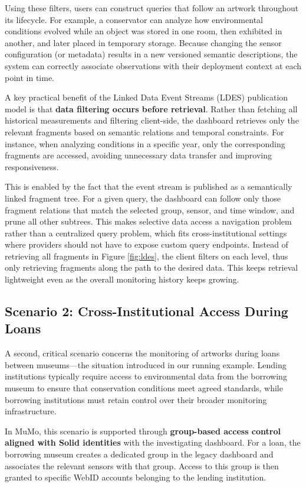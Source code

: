 Using these filters, users can construct queries that follow an artwork
throughout its lifecycle. For example, a conservator can analyze how
environmental conditions evolved while an object was stored in one room,
then exhibited in another, and later placed in temporary storage.
Because changing the sensor configuration (or metadata) results in a new
versioned semantic descriptions, the system can correctly associate
observations with their deployment context at each point in time.

A key practical benefit of the Linked Data Event Streams (LDES)
publication model is that \textbf{data filtering occurs before
retrieval}. Rather than fetching all historical measurements and
filtering client-side, the dashboard retrieves only the relevant
fragments based on semantic relations and temporal constraints. For
instance, when analyzing conditions in a specific year, only the
corresponding fragments are accessed, avoiding unnecessary data transfer
and improving responsiveness.

This is enabled by the fact that the event stream is published as a
semantically linked fragment tree. For a given query, the dashboard can
follow only those fragment relations that match the selected group,
sensor, and time window, and prune all other subtrees. This makes
selective data access a navigation problem rather than a centralized
query problem, which fits cross-institutional settings where providers
should not have to expose custom query endpoints. Instead of retrieving
all fragments in Figure \ref{fig:ldes}, the client filters on each
level, thus only retrieving fragments along the path to the desired
data. This keeps retrieval lightweight even as the overall monitoring
history keeps growing.

\subsection{Scenario 2: Cross-Institutional Access During
Loans}\label{scenario-2-cross-institutional-access-during-loans}

A second, critical scenario concerns the monitoring of artworks during
loans between museums---the situation introduced in our running example.
Lending institutions typically require access to environmental data from
the borrowing museum to ensure that conservation conditions meet agreed
standards, while borrowing institutions must retain control over their
broader monitoring infrastructure.

In MuMo, this scenario is supported through \textbf{group-based access
control aligned with Solid identities} with the investigating dashboard.
For a loan, the borrowing museum creates a dedicated group in the legacy
dashboard and associates the relevant sensors with that group. Access to
this group is then granted to specific WebID accounts belonging to the
lending institution.

